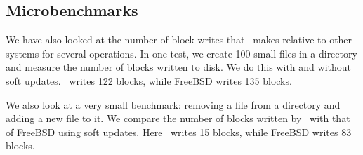 \begin{comment}
\begin{figure}[htb]
\centering
\texttt{[image: opts-patches]}
\texttt{[image: opts-rollback]}
\begin{tabular}{|l|r|r|} \hline
Optimization & Untar (sys sec) & Delete (sys sec) \\ \hline\hline
None & 4.42 & 1.14 \\ \hline\hline
\Nrb\ \Chdescs{} & 4.53 & 1.08 \\ \hline
Overlap Merge & 3.58 & 0.85 \\ \hline\hline
HP $+$ OM & 3.58 & 0.75 \\ \hline
\end{tabular}
\caption{Effects of \nrb\ \chdescs\ with \nrb\ merging and overlap
merging for the untar and rm tests.}
\label{fig:opts}
\end{figure}
\end{comment}

\begin{comment}
\begin{figure}[htb]
\vspace{-0.5\baselineskip}
\centering{
\texttt{[image: rb\_chdesc\_size]}
}
\vspace{-0.5\baselineskip}
\caption{\label{fig:patchsize-histo} \Rb\ \chdesc\ size histogram for a sample
workload (extracting a large archive into ext2). All the \chdescs\ larger than
63 bytes have been optimized into \nrb\ \chdescs. \Rb\ \chdescs\ 4 bytes and
smaller account for about 51\% of all \rb\ \chdescs.}
\end{figure}
\end{comment}

\subsection {Microbenchmarks}
We have also looked at the number of block writes that \Kudos\ makes
relative to other systems for several operations. In one test, we
create 100 small files in a directory and measure the number of blocks
written to disk. We do this with and without soft updates. \Kudos\
writes 122 blocks, while FreeBSD writes 135 blocks.

We also look at a very small benchmark: removing a file from a
directory and adding a new file to it. We compare the number of blocks
written by \Kudos\ with that of FreeBSD using soft updates. Here
\Kudos\ writes 15 blocks, while FreeBSD writes 83 blocks.

